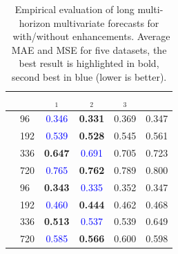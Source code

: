 \begin{table}[ht!] 
\scriptsize
    \begin{center}
    \caption{Empirical evaluation of long multi-horizon multivariate forecasts for \DilRNN\ with/without enhancements. Average MAE and MSE for five datasets, the best result is highlighted in bold, second best in blue (lower is better).}
    \label{table:ablation_rnn}
	\begin{tabular}{ll | cccc} \toprule
    						&     & \DilRNN$_{1}$            & \DilRNN$_{2}$           & \DilRNN$_{3}$    & \DilRNN  \\ \midrule
\parbox[t]{1mm}{}
							& 96  & \textcolor{blue}{0.346}  & \textbf{0.331}          & 0.369            & 0.347    \\
							& 192 & \textcolor{blue}{0.539}  & \textbf{0.528}          & 0.545            & 0.561    \\
							& 336 & \textbf{0.647}           & \textcolor{blue}{0.691} & 0.705            & 0.723    \\
							& 720 & \textcolor{blue}{0.765}  & \textbf{0.762}          & 0.789            & 0.800    \\ \midrule
\parbox[t]{1mm}{}
							& 96  & \textbf{0.343}           & \textcolor{blue}{0.335} & 0.352            & 0.347   \\
							& 192 & \textcolor{blue}{0.460}  & \textbf{0.444}          & 0.462            & 0.468   \\
							& 336 & \textbf{0.513}           & \textcolor{blue}{0.537} & 0.539            & 0.649   \\
							& 720 & \textcolor{blue}{0.585}  & \textbf{0.566}          & 0.600            & 0.598   \\ \bottomrule
	\end{tabular}
	\end{center}
\end{table}